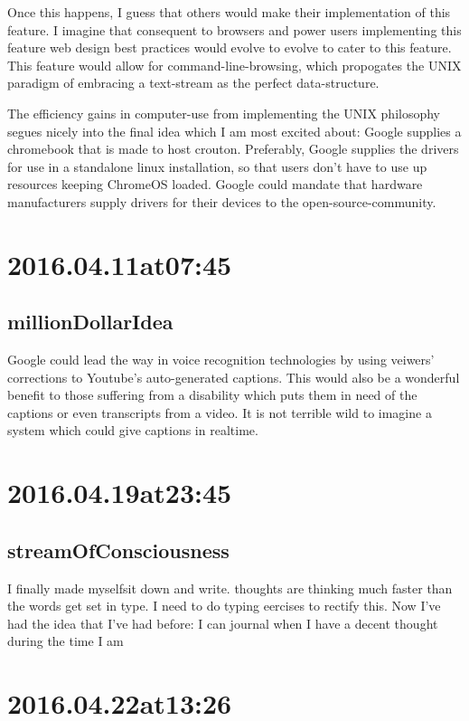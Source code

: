 \begin{enumerate}
Once this happens, I guess that others would make their implementation of this feature. I imagine that consequent to browsers and power users implementing this feature web design best practices would evolve to evolve to cater to this feature. This feature would allow for command-line-browsing, which propogates the UNIX paradigm of embracing a text-stream as the perfect data-structure.

The efficiency gains in computer-use from implementing the UNIX philosophy segues nicely into the final idea which I am most excited about: Google supplies a chromebook that is made to host crouton. Preferably, Google supplies the drivers for use in a standalone linux installation, so that users don't have to use up resources keeping ChromeOS loaded. Google could mandate that hardware manufacturers supply drivers for their devices to the open-source-community. 

\section*{ 2016.04.11at07:45 }
\subsection*{millionDollarIdea}
Google could lead the way in voice recognition technologies by using veiwers' corrections to Youtube's auto-generated captions. This would also be a wonderful benefit to those suffering from a disability which puts them in need of the captions or even transcripts from a video. It is not terrible wild to imagine a system which could give captions in realtime.

\section*{ 2016.04.19at23:45 }
\subsection*{streamOfConsciousness}
I finally made myselfsit down and write. thoughts are thinking much faster than the words get set in type. I need to do typing eercises to rectify this. Now I've had the idea that I've had before: I can journal when I have a decent thought during the time I am 

\section*{ 2016.04.22at13:26 }

\end{enumerate}
